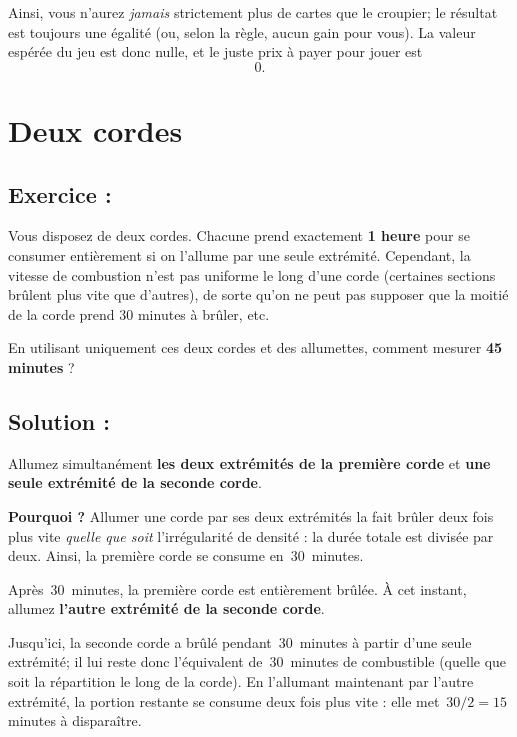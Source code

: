 Ainsi, vous n’aurez \emph{jamais} strictement plus de cartes que le croupier; le résultat est toujours une égalité (ou, selon la règle, aucun gain pour vous). La valeur espérée du jeu est donc nulle, et le juste prix à payer pour jouer est
\[
\boxed{0}.
\]


\section{Deux cordes}

\subsection*{Exercice :}

\begin{exerciseBox}
Vous disposez de deux cordes. Chacune prend exactement \textbf{1 heure} pour se consumer entièrement si on l’allume par une seule extrémité.  
Cependant, la vitesse de combustion n’est pas uniforme le long d’une corde (certaines sections brûlent plus vite que d’autres), de sorte qu’on ne peut pas supposer que la moitié de la corde prend 30 minutes à brûler, etc.  

En utilisant uniquement ces deux cordes et des allumettes, comment mesurer \textbf{45 minutes} ?
    
\end{exerciseBox}


\subsection*{Solution :}

Allumez simultanément \textbf{les deux extrémités de la première corde} et \textbf{une seule extrémité de la seconde corde}.  

\medskip
\noindent\textbf{Pourquoi ?}  
Allumer une corde par ses deux extrémités la fait brûler deux fois plus vite \emph{quelle que soit} l’irrégularité de densité : la durée totale est divisée par deux. Ainsi, la première corde se consume en \(\,30\,\) minutes.

\medskip
\noindent Après \(\,30\,\) minutes, la première corde est entièrement brûlée. À cet instant,
allumez \textbf{l’autre extrémité de la seconde corde}.  

Jusqu’ici, la seconde corde a brûlé pendant \(\,30\,\) minutes à partir d’une seule extrémité; il lui reste donc l’équivalent de \(\,30\,\) minutes de combustible (quelle que soit la répartition le long de la corde). En l’allumant maintenant par l’autre extrémité, la portion restante se consume deux fois plus vite : elle met \(\,30/2=15\,\) minutes à disparaître.

